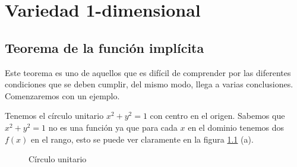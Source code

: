 \chapter{Variedad 1-dimensional}
\section{Teorema de la funci\'on impl\'icita}
Este teorema es uno de aquellos que es dif\'icil de comprender por las
diferentes condiciones que se deben cumplir, del mismo modo, llega a 
varias conclusiones. Comenzaremos con un ejemplo.

\begin{example}\label{ex:unit-circle}
    Tenemos el c\'irculo unitario $x^{2} + y^{2} = 1$ con centro en el
    origen. Sabemos que  $x^{2} + y^{2} = 1$ no es una funci\'on ya que
    para cada $x$ en el dominio tenemos dos $f(x)$ en el rango, esto se
    puede ver claramente en la figura \ref{fig:unit-circle12} (a). 

    \begin{figure}[!ht]%
        \centering
        \label{fig:unit-circle123}
        \qquad
        \caption{C\'irculo unitario}
        \label{fig:unit-circle12}
    \end{figure}



\end{example}
